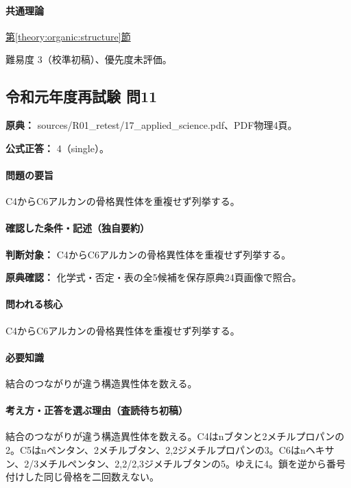 \paragraph{共通理論} \hyperref[theory:organic:structure]{第\ref*{theory:organic:structure}節}

\par 難易度 3（校準初稿）、優先度未評価。

\subsection{令和元年度再試験 問11}
\label{q:r01-ret-applied-11}

\noindent\textbf{原典：} sources/R01\_retest/17\_applied\_science.pdf、PDF物理4頁。

\textbf{公式正答：} 4（single）。

\paragraph{問題の要旨} C4からC6アルカンの骨格異性体を重複せず列挙する。

\paragraph{確認した条件・記述（独自要約）}\mbox{}\par

\noindent\textbf{判断対象：} C4からC6アルカンの骨格異性体を重複せず列挙する。\par

\noindent\textbf{原典確認：} 化学式・否定・表の全5候補を保存原典24頁画像で照合。\par

\paragraph{問われる核心} C4からC6アルカンの骨格異性体を重複せず列挙する。

\paragraph{必要知識} 結合のつながりが違う構造異性体を数える。

\paragraph{考え方・正答を選ぶ理由（査読待ち初稿）} 結合のつながりが違う構造異性体を数える。C4はnブタンと2メチルプロパンの2。C5はnペンタン、2メチルブタン、2,2ジメチルプロパンの3。C6はnヘキサン、2/3メチルペンタン、2,2/2,3ジメチルブタンの5。ゆえに4。鎖を逆から番号付けした同じ骨格を二回数えない。


